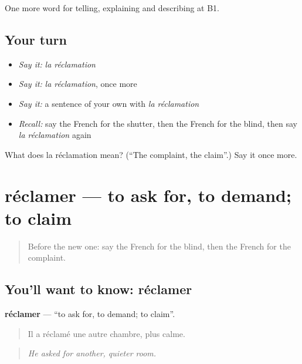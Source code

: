 \begin{grammarlens}[title={What you've built}]
One more word for telling, explaining and describing at B1.
\end{grammarlens}

\subsection*{Your turn}
\begin{itemize}
\raggedright
  \item \emph{Say it:} \emph{la réclamation}
  \item \emph{Say it:} \emph{la réclamation}, once more
  \item \emph{Say it:} a sentence of your own with \emph{la réclamation}
  \item \emph{Recall:} say the French for the shutter, then the French for the blind, then say \emph{la réclamation} again
\end{itemize}

\begin{tcolorbox}[breakable,colback=teal!4,colframe=teal!35!black,title={Before you move on}]
What does la réclamation mean? (\textquotedblleft{}The complaint, the claim\textquotedblright{}.) Say it once more.
\end{tcolorbox}
\section[réclamer]{réclamer — to ask for, to demand; to claim}

\label{lesson:FR-C431-reclamer}



\begin{quote}
Before the new one: say the French for the blind, then the French for the complaint.
\end{quote}

\subsection*{You'll want to know: réclamer}
\textbf{réclamer} — \textquotedblleft{}to ask for, to demand; to claim\textquotedblright{}.

\begin{quote}
Il a réclamé une autre chambre, plus calme.
\end{quote}

\begin{quote}
\emph{He asked for another, quieter room.}
\end{quote}

